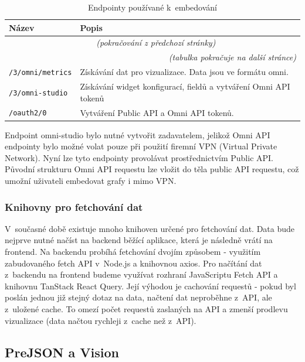 \documentclass[czech, bc, kiv, he, iso690numb]{fasthesis}
\begin{document}
	\begin{longtable}{p{}p{}}
	\caption{Endpointy používané k~embedování}
	\label{tab:embeddingEndpoints}\\
	\toprule[1.5pt]
	\textbf{Název} & \textbf{Popis}\\
	\midrule
	\endfirsthead
	\multicolumn{2}{c}{\tablename{}~\thetable{} \textit{(pokračování z předchozí stránky)}}\\
	\endhead
	\midrule
	\multicolumn{2}{r}{\textit{(tabulka pokračuje na další stránce)}}\\
	\endfoot
	\bottomrule[1.5pt]
	\endlastfoot
	\verb"/3/omni/metrics" & Získávání dat pro vizualizace. Data jsou ve formátu omni. \\
	\midrule
	\verb"/3/omni-studio" &  Získávání widget konfigurací, fieldů a vytváření Omni API tokenů\\
	\midrule
	\verb"/oauth2/0" &  Vytváření Public API a Omni API tokenů. \\
	\end{longtable}

Endpoint omni-studio bylo nutné vytvořit zadavatelem, jelikož Omni API endpointy bylo možné volat pouze při použití firemní VPN (Virtual Private Network). Nyní lze tyto endpointy provolávat prostřednictvím Public API. Původní
strukturu Omni API requestu lze vložit do těla public API requestu, což umožní uživateli embedovat grafy i mimo VPN.

\subsubsection{Knihovny pro fetchování dat}

V~současné době existuje mnoho knihoven určené pro fetchování dat. Data bude nejprve nutné načíst na backend běžící aplikace, která je následně vrátí na frontend. Na backendu probíhá fetchování dvojím způsobem - 
využitím zabudovaného fetch API v~Node.js a knihovnou axios. Pro načítání dat z~backendu na frontend budeme využívat rozhraní JavaScriptu Fetch API a knihovnu TanStack React Query. Její výhodou je cachování
requestů \cite{tanstackQueryDocs} - pokud byl poslán jednou již stejný dotaz na data, načtení dat neproběhne z~API, ale z~uložené cache. To omezí počet requestů zaslaných na API a zmenší prodlevu vizualizace (data načtou rychleji z~cache než z~API). 

\subsection{PreJSON a Vision}
\end{document}
